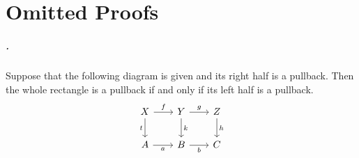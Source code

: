 \chapter{Omitted Proofs}

\paragraph{.}
    Suppose that the following diagram is given and its right half is a pullback. Then the whole rectangle is a pullback if and only if its left half is a pullback.
    \[
	    \begin{tikzcd}[row sep = 20, column sep = 20]
            X \arrow[r, "f"] \arrow[d, "t"swap] & Y \arrow[r, "g"] \arrow[d, "k"] & Z \arrow[d, "h"] \\
            A \arrow[r, "a"swap] & B \arrow[r, "b"swap] & C
        \end{tikzcd}
    \]
